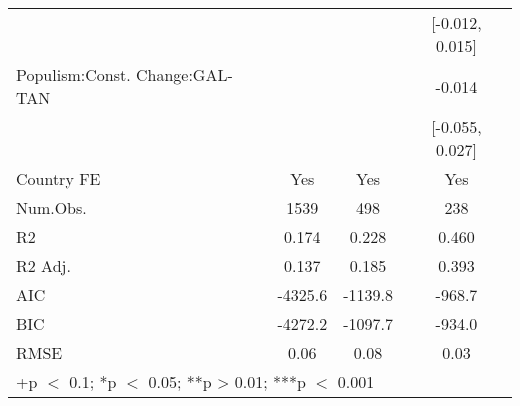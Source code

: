 \begin{table}
\begin{tabular}[t]{lccc}
 &  &  & {}[-0.012, 0.015]\\
Populism:Const. Change:GAL-TAN &  &  & -0.014\\
 &  &  & {}[-0.055, 0.027]\\
\midrule
Country FE & Yes & Yes & Yes\\
Num.Obs. & 1539 & 498 & 238\\
R2 & 0.174 & 0.228 & 0.460\\
R2 Adj. & 0.137 & 0.185 & 0.393\\
AIC & -4325.6 & -1139.8 & -968.7\\
BIC & -4272.2 & -1097.7 & -934.0\\
RMSE & 0.06 & 0.08 & 0.03\\
\bottomrule
\multicolumn{4}{l}{\rule{0pt}{1em}+p $<$ 0.1; *p $<$ 0.05; **p > 0.01; ***p $<$ 0.001}\\
\end{tabular}
\end{table}
